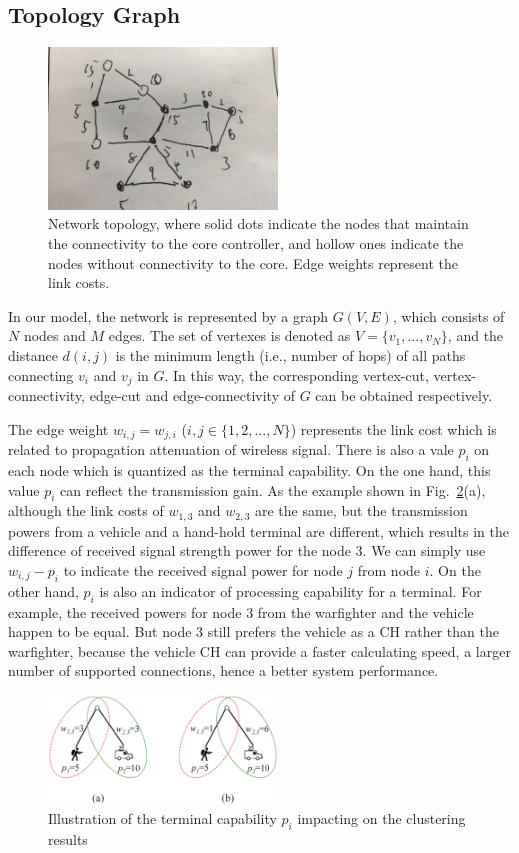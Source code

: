 \documentclass[conference]{IEEEtran}
\begin{document}
\subsection{Topology Graph}
\begin{figure}
\centering
\includegraphics[width=2.4in]{model}
\caption{Network topology, where solid dots indicate the nodes that maintain the connectivity to the core controller, and hollow ones indicate the nodes without connectivity to the core. Edge weights represent the link costs.}
\label{model}
\end{figure}
In our model, the network is represented by a graph $G(V,E)$, which consists of $N$ nodes and $M$ edges. The set of vertexes is denoted as $V = \{v_1,...,v_N\}$, and the distance $d(i,j)$ is the minimum length (i.e., number of hops) of all paths connecting $v_i$ and $v_j$ in $G$. In this way, the corresponding vertex-cut, vertex-connectivity, edge-cut and edge-connectivity of $G$ can be obtained respectively.

The edge weight $w_{i,j}=w_{j,i}$ ($i,j \in \{ 1,2,...,N\}$) represents the link cost which is related to propagation attenuation of wireless signal. There is also a vale $p_i$ on each node which is quantized as the terminal capability. On the one hand, this value $p_i$ can reflect the transmission gain. As the example shown in Fig.~\ref{manvehicle}(a), although the link costs of $w_{1,3}$ and $w_{2,3}$ are the same, but the transmission powers from a vehicle and a hand-hold terminal are different, which results in the difference of received signal strength power for the node 3. We can simply use $w_{i,j}-p_i$ to indicate the received signal power for node $j$ from node $i$. On the other hand, $p_i$ is also an indicator of processing capability for a terminal. For example, the received powers for node 3 from the warfighter and the vehicle happen to be equal. But node 3 still prefers the vehicle as a CH rather than the warfighter, because the vehicle CH can provide a faster calculating speed, a larger number of supported connections, hence a better system performance.
\begin{figure}
\centering
\includegraphics[width=2.4in]{manvehicle}
\caption{Illustration of the terminal capability $p_i$ impacting on the clustering results}
\label{manvehicle}
\end{figure}
\end{document}
